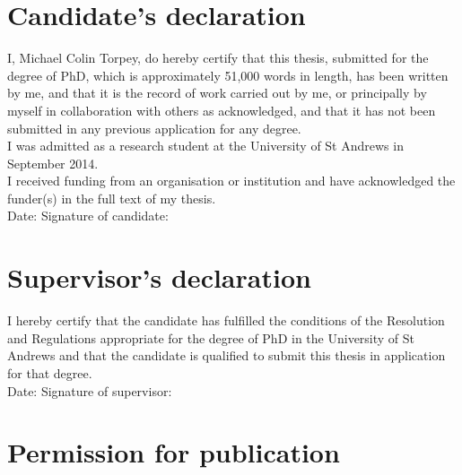 

\vspace{-1.3em}
\section*{Candidate's declaration}

\noindent
I, Michael Colin Torpey, do hereby certify that this thesis, submitted for the
degree of PhD, which is approximately
51,000
words in length, has been written by me, and that it is the record of work
carried out by me, or principally by myself in collaboration with others as
acknowledged, and that it has not been submitted in any previous application for
any degree.
\\

\noindent
I was admitted as a research student at the University of St Andrews in
September 2014.
\\

\noindent
I received funding from an organisation or institution and have acknowledged the
funder(s) in the full text of my thesis.
\\

\vspace{1.0em}
\noindent
Date:\makebox[7em]{\dotfill}
Signature of candidate:\dotfill
\\

\vspace{-1.3em}
\section*{Supervisor's declaration}

\noindent
I hereby certify that the candidate has fulfilled the conditions of the
Resolution and Regulations appropriate for the degree of PhD in the University
of St Andrews and that the candidate is qualified to submit this thesis in
application for that degree.
\\

\vspace{1.0em}
\noindent
Date:\makebox[7em]{\dotfill}
Signature of supervisor:\dotfill
\\

\vspace{-1.3em}
\section*{Permission for publication}

